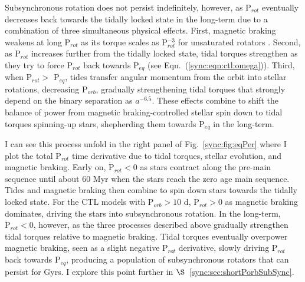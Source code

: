 Subsynchronous rotation does not persist indefinitely, however, as P$_{rot}$ eventually decreases back towards the tidally locked state in the long-term due to a combination of three simultaneous physical effects.  First, magnetic braking weakens at long P$_{rot}$ as its torque scales as P$_{rot}^{-3}$ for unsaturated rotators \citep{Matt2015}. Second, as P$_{rot}$ increases further from the tidally locked state, tidal torques strengthen as they try to force P$_{rot}$ back towards P$_{eq}$ (see Eqn.~(\ref{sync:eqn:ctl:omega})). Third, when P$_{rot} > $ P$_{eq}$, tides transfer angular momentum from the orbit into stellar rotations, decreasing P$_{orb}$, gradually strengthening tidal torques that strongly depend on the binary separation as $a^{-6.5}$.  These effects combine to shift the balance of power from magnetic braking-controlled stellar spin down to tidal torques spinning-up stars, shepherding them towards P$_{eq}$ in the long-term. 

I can see this process unfold in the right panel of Fig.~\ref{sync:fig:eqPer} where I plot the total P$_{rot}$ time derivative due to tidal torques, stellar evolution, and magnetic braking. Early on, $\dot{\mathrm{P}}_{rot} < 0$ as stars contract along the pre-main sequence until about 60 Myr when the stars reach the zero age main sequence. Tides and magnetic braking then combine to spin down stars towards the tidally locked state. For the CTL models with P$_{orb} > 10$ d, $\dot{\mathrm{P}}_{rot} > 0$ as magnetic braking dominates, driving the stars into subsynchronous rotation. In the long-term, $\ddot{\mathrm{P}}_{rot} < 0$, however, as the three processes described above gradually strengthen tidal torques relative to magnetic braking.  Tidal torques eventually overpower magnetic braking, seen as a slight negative P$_{rot}$ derivative, slowly driving P$_{rot}$ back towards P$_{eq}$, producing a population of subsynchronous rotators that can persist for Gyrs. I explore this point further in $\S$~\ref{sync:sec:shortPorbSubSync}.  


